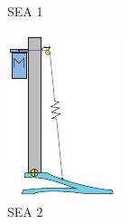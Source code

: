 \begin{figure}[htb]
\begin{subfigure}{.19\textwidth}
    \caption{SEA 1}
    \label{fig:series1}
  \end{subfigure}
  \begin{subfigure}{.2\textwidth}
    \centering
    \includegraphics[width=\linewidth]{figures/illustration_serial_pulley.pdf}
    \caption{SEA 2}
    \label{fig:series2}
  \end{subfigure}
  \begin{subfigure}{.19\textwidth}
    \centering

\end{subfigure}
\end{figure}
